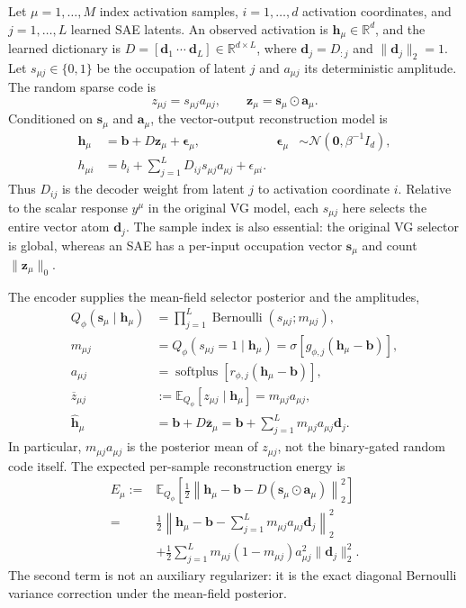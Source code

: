\documentclass[aps,pre,reprint,superscriptaddress,amsmath,amssymb,nofootinbib]{revtex4-2}
\newcommand{\E}{\mathbb{E}}
\begin{document}
Let $\mu=1,\ldots,M$ index activation samples, $i=1,\ldots,d$ activation
coordinates, and $j=1,\ldots,L$ learned SAE latents.  An observed activation
is $\bm h_\mu\in\mathbb R^d$, and the learned dictionary is
$D=[\bm d_1\ \cdots\ \bm d_L]\in\mathbb R^{d\times L}$, where
$\bm d_j=D_{:j}$ and $\lVert\bm d_j\rVert_2=1$.  Let
$s_{\mu j}\in\{0,1\}$ be the occupation of latent $j$ and $a_{\mu j}$ its
deterministic amplitude.  The random sparse code is
\begin{equation}
 z_{\mu j}=s_{\mu j}a_{\mu j},
 \qquad \bm z_\mu=\bm s_\mu\odot\bm a_\mu.
 \label{eq:latent-code}
\end{equation}
Conditioned on $\bm s_\mu$ and $\bm a_\mu$, the vector-output reconstruction
model is
\begin{align}
 \bm h_\mu
 &=\bm b+D\bm z_\mu+\bm\epsilon_\mu,
 &\bm\epsilon_\mu&\sim\mathcal N(\bm0,\beta^{-1}I_d),
 \label{eq:vector-reconstruction}\\
 h_{\mu i}
 &=b_i+\sum_{j=1}^{L}D_{ij}s_{\mu j}a_{\mu j}+\epsilon_{\mu i}.
 \label{eq:component-reconstruction}
\end{align}
Thus $D_{ij}$ is the decoder weight from latent $j$ to activation coordinate
$i$.  Relative to the scalar response $y^\mu$ in the original VG model, each
$s_{\mu j}$ here selects the entire vector atom $\bm d_j$.  The sample index is
also essential: the original VG selector is global, whereas an SAE has a
per-input occupation vector $\bm s_\mu$ and count $\lVert\bm z_\mu\rVert_0$.

The encoder supplies the mean-field selector posterior and the amplitudes,
\begin{align}
 Q_\phi(\bm s_\mu\mid\bm h_\mu)
   &= \prod_{j=1}^{L}\operatorname{Bernoulli}(s_{\mu j};m_{\mu j}),\\
 m_{\mu j}&=Q_\phi(s_{\mu j}=1\mid\bm h_\mu)
 =\sigma[g_{\phi,j}(\bm h_\mu-\bm b)],\\
 a_{\mu j}&=\operatorname{softplus}[r_{\phi,j}(\bm h_\mu-\bm b)],\\
 \overline z_{\mu j}
 &:=\E_{Q_\phi}[z_{\mu j}\mid\bm h_\mu]
 =m_{\mu j}a_{\mu j},\\
 \widehat{\bm h}_\mu
 &=\bm b+D\overline{\bm z}_\mu
 =\bm b+\sum_{j=1}^{L}m_{\mu j}a_{\mu j}\bm d_j .
 \label{eq:mean-reconstruction}
\end{align}
In particular, $m_{\mu j}a_{\mu j}$ is the posterior mean of $z_{\mu j}$,
not the binary-gated random code itself.  The expected per-sample
reconstruction energy is
\begin{align}
 E_\mu
 :={}&\E_{Q_\phi}\!\left[
 \frac12\left\lVert\bm h_\mu-\bm b-D(\bm s_\mu\odot\bm a_\mu)
 \right\rVert_2^2\right]\nonumber\\
 ={}& \frac12\left\lVert
 \bm h_\mu-\bm b-
 \sum_{j=1}^{L}m_{\mu j}a_{\mu j}\bm d_j
 \right\rVert_2^2 \nonumber\\
 &+\frac12\sum_{j=1}^{L}m_{\mu j}(1-m_{\mu j})a_{\mu j}^2
 \lVert\bm d_j\rVert_2^2 .
 \label{eq:energy}
\end{align}
The second term is not an auxiliary regularizer: it is the exact diagonal
Bernoulli variance correction under the mean-field posterior.
\end{document}
